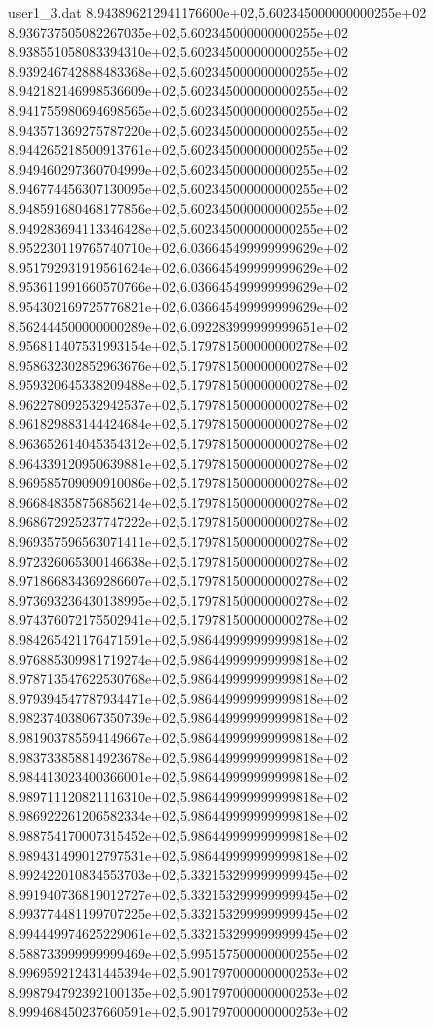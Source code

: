 \begin{filecontents}{user1_3.dat}
8.943896212941176600e+02,5.602345000000000255e+02
8.936737505082267035e+02,5.602345000000000255e+02
8.938551058083394310e+02,5.602345000000000255e+02
8.939246742888483368e+02,5.602345000000000255e+02
8.942182146998536609e+02,5.602345000000000255e+02
8.941755980694698565e+02,5.602345000000000255e+02
8.943571369275787220e+02,5.602345000000000255e+02
8.944265218500913761e+02,5.602345000000000255e+02
8.949460297360704999e+02,5.602345000000000255e+02
8.946774456307130095e+02,5.602345000000000255e+02
8.948591680468177856e+02,5.602345000000000255e+02
8.949283694113346428e+02,5.602345000000000255e+02
8.952230119765740710e+02,6.036645499999999629e+02
8.951792931919561624e+02,6.036645499999999629e+02
8.953611991660570766e+02,6.036645499999999629e+02
8.954302169725776821e+02,6.036645499999999629e+02
8.562444500000000289e+02,6.092283999999999651e+02
8.956811407531993154e+02,5.179781500000000278e+02
8.958632302852963676e+02,5.179781500000000278e+02
8.959320645338209488e+02,5.179781500000000278e+02
8.962278092532942537e+02,5.179781500000000278e+02
8.961829883144424684e+02,5.179781500000000278e+02
8.963652614045354312e+02,5.179781500000000278e+02
8.964339120950639881e+02,5.179781500000000278e+02
8.969585709090910086e+02,5.179781500000000278e+02
8.966848358756856214e+02,5.179781500000000278e+02
8.968672925237747222e+02,5.179781500000000278e+02
8.969357596563071411e+02,5.179781500000000278e+02
8.972326065300146638e+02,5.179781500000000278e+02
8.971866834369286607e+02,5.179781500000000278e+02
8.973693236430138995e+02,5.179781500000000278e+02
8.974376072175502941e+02,5.179781500000000278e+02
8.984265421176471591e+02,5.986449999999999818e+02
8.976885309981719274e+02,5.986449999999999818e+02
8.978713547622530768e+02,5.986449999999999818e+02
8.979394547787934471e+02,5.986449999999999818e+02
8.982374038067350739e+02,5.986449999999999818e+02
8.981903785594149667e+02,5.986449999999999818e+02
8.983733858814923678e+02,5.986449999999999818e+02
8.984413023400366001e+02,5.986449999999999818e+02
8.989711120821116310e+02,5.986449999999999818e+02
8.986922261206582334e+02,5.986449999999999818e+02
8.988754170007315452e+02,5.986449999999999818e+02
8.989431499012797531e+02,5.986449999999999818e+02
8.992422010834553703e+02,5.332153299999999945e+02
8.991940736819012727e+02,5.332153299999999945e+02
8.993774481199707225e+02,5.332153299999999945e+02
8.994449974625229061e+02,5.332153299999999945e+02
8.588733999999999469e+02,5.995157500000000255e+02
8.996959212431445394e+02,5.901797000000000253e+02
8.998794792392100135e+02,5.901797000000000253e+02
8.999468450237660591e+02,5.901797000000000253e+02

\end{filecontents}
